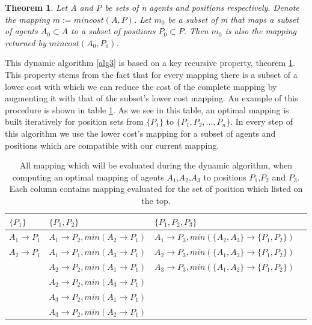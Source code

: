 \newtheorem{theorem}{Theorem}[section] 
\begin{theorem}
\label{Theorem 1}
Let A and P be sets of n agents and positions respectively. Denote the mapping $ m := mincost(A,P) $. Let $ m_{0} $ be a subset of m that maps a subset of agents $ A_{0} \subset A $ to a subset of positions $ P_{0} \subset P $. Then $ m_{0} $ is also the mapping returned by $ mincost(A_{0},P_{0}) $.
\end{theorem}


This dynamic algorithm \ref{alg3} is based on a key recursive property, theorem \ref{Theorem 1}.  This property stems from the fact that for every mapping there is a subset of a lower cost with which we can reduce the cost of the complete mapping by augmenting  it with that of the subset's lower cost mapping. An example of this procedure is shown in table \ref{tab:DynamicTable}. As we see in this table, an optimal mapping is built iteratively for position sets from $\lbrace P_{1} \rbrace$ to $\lbrace P_{1},P_{2},...,P_{n} \rbrace$. In every step of this algorithm we use the lower cost's mapping for a subset of agents and positions which are compatible with our current mapping.



\begin{table}[htb!]
\label{tab:DynamicTable}
\centering
    \begin{tabular}{ | l | l | l | p{5cm} |}
    \hline
    $\lbrace P_{1} \rbrace$   & $\lbrace P_{1},P_{2} \rbrace$ 	& $\lbrace P_{1},P_{2},P_{3} \rbrace$\\ \hline
    $A_{1} \rightarrow P_{1}$ & $A_{1} \rightarrow P_{2},min(A_{2} \rightarrow P_{1})$	 	& $A_{1} \rightarrow P_{3},min(\lbrace A_{2},A_{3} \rbrace \rightarrow \lbrace P_{1},P_{2} \rbrace)$  \\ \hline
    $A_{2} \rightarrow P_{1}$ & $A_{1} \rightarrow P_{1},min(A_{3} \rightarrow P_{1})$	 	& $A_{2} \rightarrow P_{3},min(\lbrace A_{1},A_{3} \rbrace \rightarrow \lbrace P_{1},P_{2} \rbrace)$  \\ \hline
     						  & $A_{2} \rightarrow P_{2},min(A_{1} \rightarrow P_{1})$ 		& $A_{3} \rightarrow P_{3},min(\lbrace A_{1},A_{2} \rbrace \rightarrow \lbrace P_{1},P_{2} \rbrace)$  \\ \hline
       						  & $A_{2} \rightarrow P_{2},min(A_{3} \rightarrow P_{1})$ 		&   \\ \hline
       						  & $A_{3} \rightarrow P_{2},min(A_{1} \rightarrow P_{1})$ 		&   \\ \hline
    						  & $A_{3} \rightarrow P_{2},min(A_{2} \rightarrow P_{1})$		&   \\
    \hline

    \end{tabular}
    
    \caption{All mapping which will be evaluated during the dynamic algorithm, when computing an optimal mapping of agents $A_{1}$,$A_{2}$,$A_{3}$ to positions $P_{1}$,$P_{2}$ and $P_{3}$. Each column contains mapping evaluated for the set of position which listed on the top.}    
\end{table}

